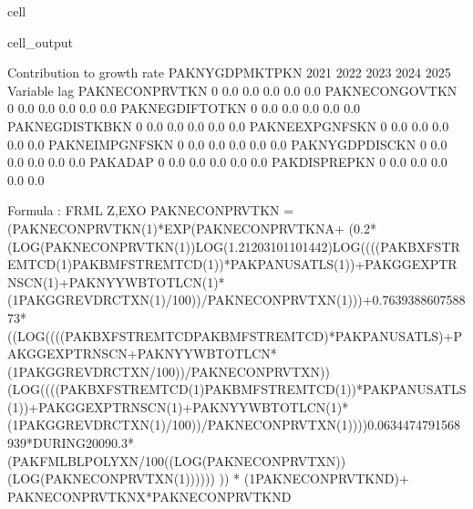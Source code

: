 \documentclass[letterpaper,10pt,english]{jupyterBook}
\begin{document}
\begin{sphinxuseclass}{cell}
\begin{sphinxVerbatimOutput}
\begin{sphinxuseclass}{cell_output}
\begin{sphinxVerbatim}[commandchars=\\\{\}]
 Contribution to growth rate PAKNYGDPMKTPKN
                          2021        2022        2023        2024        2025
Variable       lag                                                            
PAKNECONPRVTKN 0         \PYGZhy{}0.0\PYGZpc{}       \PYGZhy{}0.0\PYGZpc{}       \PYGZhy{}0.0\PYGZpc{}       \PYGZhy{}0.0\PYGZpc{}       \PYGZhy{}0.0\PYGZpc{}
PAKNECONGOVTKN 0          0.0\PYGZpc{}        0.0\PYGZpc{}        0.0\PYGZpc{}        0.0\PYGZpc{}        0.0\PYGZpc{}
PAKNEGDIFTOTKN 0          0.0\PYGZpc{}        0.0\PYGZpc{}        0.0\PYGZpc{}        0.0\PYGZpc{}        0.0\PYGZpc{}
PAKNEGDISTKBKN 0         \PYGZhy{}0.0\PYGZpc{}       \PYGZhy{}0.0\PYGZpc{}       \PYGZhy{}0.0\PYGZpc{}       \PYGZhy{}0.0\PYGZpc{}       \PYGZhy{}0.0\PYGZpc{}
PAKNEEXPGNFSKN 0         \PYGZhy{}0.0\PYGZpc{}       \PYGZhy{}0.0\PYGZpc{}       \PYGZhy{}0.0\PYGZpc{}       \PYGZhy{}0.0\PYGZpc{}       \PYGZhy{}0.0\PYGZpc{}
PAKNEIMPGNFSKN 0          0.0\PYGZpc{}        0.0\PYGZpc{}        0.0\PYGZpc{}        0.0\PYGZpc{}        0.0\PYGZpc{}
PAKNYGDPDISCKN 0         \PYGZhy{}0.0\PYGZpc{}       \PYGZhy{}0.0\PYGZpc{}       \PYGZhy{}0.0\PYGZpc{}       \PYGZhy{}0.0\PYGZpc{}       \PYGZhy{}0.0\PYGZpc{}
PAKADAP        0         \PYGZhy{}0.0\PYGZpc{}       \PYGZhy{}0.0\PYGZpc{}       \PYGZhy{}0.0\PYGZpc{}       \PYGZhy{}0.0\PYGZpc{}       \PYGZhy{}0.0\PYGZpc{}
PAKDISPREPKN   0         \PYGZhy{}0.0\PYGZpc{}       \PYGZhy{}0.0\PYGZpc{}       \PYGZhy{}0.0\PYGZpc{}       \PYGZhy{}0.0\PYGZpc{}       \PYGZhy{}0.0\PYGZpc{}

Formula        : FRML \PYGZlt{}Z,EXO\PYGZgt{} PAKNECONPRVTKN = (PAKNECONPRVTKN(\PYGZhy{}1)*EXP(PAKNECONPRVTKN\PYGZus{}A+ (\PYGZhy{}0.2*(LOG(PAKNECONPRVTKN(\PYGZhy{}1))\PYGZhy{}LOG(1.21203101101442)\PYGZhy{}LOG((((PAKBXFSTREMTCD(\PYGZhy{}1)\PYGZhy{}PAKBMFSTREMTCD(\PYGZhy{}1))*PAKPANUSATLS(\PYGZhy{}1))+PAKGGEXPTRNSCN(\PYGZhy{}1)+PAKNYYWBTOTLCN(\PYGZhy{}1)*(1\PYGZhy{}PAKGGREVDRCTXN(\PYGZhy{}1)/100))/PAKNECONPRVTXN(\PYGZhy{}1)))+0.763938860758873*((LOG((((PAKBXFSTREMTCD\PYGZhy{}PAKBMFSTREMTCD)*PAKPANUSATLS)+PAKGGEXPTRNSCN+PAKNYYWBTOTLCN*(1\PYGZhy{}PAKGGREVDRCTXN/100))/PAKNECONPRVTXN))\PYGZhy{}(LOG((((PAKBXFSTREMTCD(\PYGZhy{}1)\PYGZhy{}PAKBMFSTREMTCD(\PYGZhy{}1))*PAKPANUSATLS(\PYGZhy{}1))+PAKGGEXPTRNSCN(\PYGZhy{}1)+PAKNYYWBTOTLCN(\PYGZhy{}1)*(1\PYGZhy{}PAKGGREVDRCTXN(\PYGZhy{}1)/100))/PAKNECONPRVTXN(\PYGZhy{}1))))\PYGZhy{}0.0634474791568939*DURING\PYGZus{}2009\PYGZhy{}0.3*(PAKFMLBLPOLYXN/100\PYGZhy{}((LOG(PAKNECONPRVTXN))\PYGZhy{}(LOG(PAKNECONPRVTXN(\PYGZhy{}1)))))) )) * (1\PYGZhy{}PAKNECONPRVTKN\PYGZus{}D)+ PAKNECONPRVTKN\PYGZus{}X*PAKNECONPRVTKN\PYGZus{}D  \PYGZdl{} 


\end{sphinxVerbatim}
\end{sphinxuseclass}
\end{sphinxVerbatimOutput}
\end{sphinxuseclass}
\end{document}
